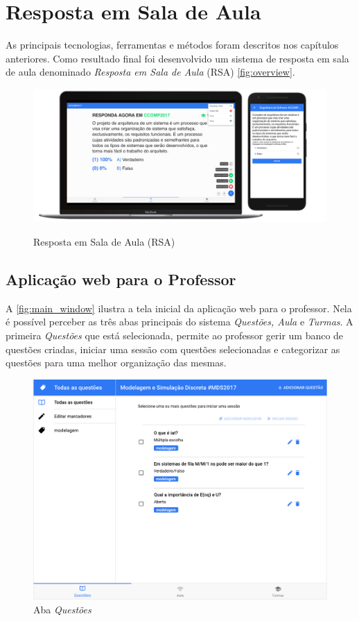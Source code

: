 \chapter{Resposta em Sala de Aula}\label{chap:rsa}

As principais tecnologias, ferramentas e métodos foram descritos nos capítulos
anteriores. Como resultado final foi desenvolvido um sistema de resposta
em sala de aula denominado \textit{Resposta em Sala de Aula} (RSA) \autoref{fig:overview}.

\begin{figure}[!ht]
  \centering
  \caption{Resposta em Sala de Aula (RSA)}
  \includegraphics[scale=.40]{imagens/telas/overview}
  \doautor
  \label{fig:overview}
\end{figure}

\section{Aplicação web para o Professor}

A \autoref{fig:main_window} ilustra a tela inicial da aplicação web para o professor.
Nela é possível perceber as três abas principais do sistema \textit{Questões, Aula} e \textit{Turmas}. A primeira \textit{Questões} que
está selecionada, permite ao professor gerir um banco de questões criadas, iniciar uma
sessão com questões selecionadas e categorizar as questões para uma melhor organização das mesmas.

\begin{figure}[!ht]
  \centering
  \caption{Aba \textit{Questões}}
  \label{fig:main_window}
  \includegraphics[scale=.30]{imagens/telas/main_window}
  \doautor
\end{figure}

